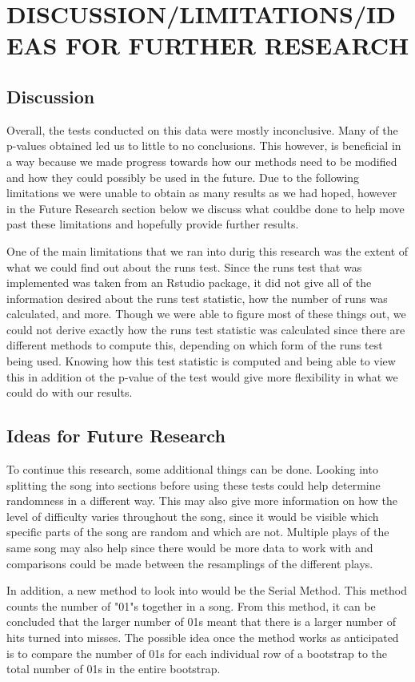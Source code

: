 \documentclass[12pt, letterpaper]{article}
\begin{document}
\section{DISCUSSION/LIMITATIONS/IDEAS FOR FURTHER RESEARCH}
\subsection{Discussion}
Overall, the tests conducted on this data were mostly inconclusive. Many of the p-values obtained led us to little to no conclusions. This however, is beneficial in a way because we made progress towards how our methods need to be modified and how they could possibly be used in the future. Due to the following limitations we were unable to obtain as many results as we had hoped, however in the Future Research section below we discuss what couldbe done to help move past these limitations and hopefully provide further results.

One of the main limitations that we ran into durig this research was the extent of what we could find out about the runs test. Since the runs test that was implemented was taken from an Rstudio package, it did not give all of the information desired about the runs test statistic, how the number of runs was calculated, and more. Though we were able to figure most of these things out, we could not derive exactly how the runs test statistic was calculated since there are different methods to compute this, depending on which form of the runs test being used. Knowing how this test statistic is computed and being able to view this in addition ot the p-value of the test would give more flexibility in what we could do with our results.

\subsection{Ideas for Future Research}
To continue this research, some additional things can be done. Looking into splitting the song into sections before using these tests could help determine randomness in a different way. This may also give more information on how the level of difficulty varies throughout the song, since it would be visible which specific parts of the song are random and which are not. Multiple plays of the same song may also help since there would be more data to work with and comparisons could be made between the resamplings of the different plays.

In addition, a new method to look into would be the Serial Method. This method counts the number of "01"s together in a song.  From this method, it can be concluded that the larger number of 01s meant that there is a larger number of hits turned into misses.  The possible idea once the method works as anticipated is to compare the number of 01s for each individual row of a bootstrap to the total number of 01s in the entire bootstrap.
\end{document}
